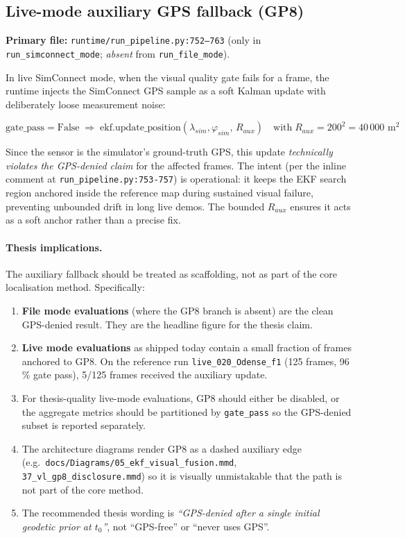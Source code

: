 \documentclass[12pt,a4paper]{article}
\begin{document}
\subsection{Live-mode auxiliary GPS fallback (GP8)}
\label{sec:gp8}

\noindent\textbf{Primary file:} \texttt{runtime/run\_pipeline.py:752--763}
(only in \texttt{run\_simconnect\_mode}; \emph{absent} from
\texttt{run\_file\_mode}).

In live SimConnect mode, when the visual quality gate fails for a frame, the
runtime injects the SimConnect GPS sample as a soft Kalman update with
deliberately loose measurement noise:

\begin{equation}
    \text{gate\_pass} = \text{False} \;\Longrightarrow\;
    \text{ekf.update\_position}(\lambda_{sim}, \varphi_{sim},\, R_{aux})
    \quad \text{with}\; R_{aux} = 200^2 = 40\,000 \text{ m}^2
    \label{eq:gp8}
\end{equation}

Since the sensor is the simulator's ground-truth GPS, this update
\emph{technically violates the GPS-denied claim} for the affected frames. The
intent (per the inline comment at \texttt{run\_pipeline.py:753-757}) is
operational: it keeps the EKF search region anchored inside the reference map
during sustained visual failure, preventing unbounded drift in long live demos.
The bounded $R_{aux}$ ensures it acts as a soft anchor rather than a precise
fix.

\paragraph{Thesis implications.}
The auxiliary fallback should be treated as scaffolding, not as part of the
core localisation method. Specifically:

\begin{enumerate}
    \item \textbf{File mode evaluations} (where the GP8 branch is absent) are
          the clean GPS-denied result. They are the headline figure for the
          thesis claim.
    \item \textbf{Live mode evaluations} as shipped today contain a small
          fraction of frames anchored to GP8. On the reference run
          \texttt{live\_020\_Odense\_f1} (125 frames, 96\,\% gate pass), 5/125
          frames received the auxiliary update.
    \item For thesis-quality live-mode evaluations, GP8 should either be
          disabled, or the aggregate metrics should be partitioned by
          \texttt{gate\_pass} so the GPS-denied subset is reported separately.
    \item The architecture diagrams render GP8 as a dashed auxiliary edge
          (e.g.\ \texttt{docs/Diagrams/05\_ekf\_visual\_fusion.mmd},
          \texttt{37\_vl\_gp8\_disclosure.mmd}) so it is visually unmistakable
          that the path is not part of the core method.
    \item The recommended thesis wording is
          \emph{``GPS-denied after a single initial geodetic prior at $t_0$''},
          not ``GPS-free'' or ``never uses GPS''.
\end{enumerate}
\end{document}
